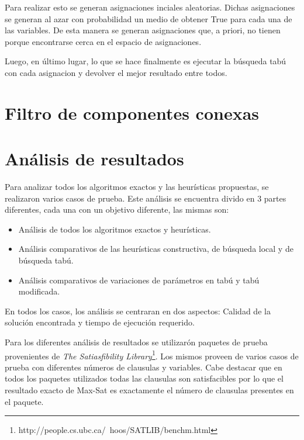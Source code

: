 \documentclass[a4paper,10pt]{article}
\begin{document}
Para realizar esto se generan asignaciones inciales aleatorias. Dichas asignaciones se generan al azar con probabilidad un medio de obtener True para cada una de las variables. De esta manera se generan asignaciones que, a priori, no tienen porque encontrarse cerca en el espacio de asignaciones.

Luego, en \'ultimo lugar, lo que se hace finalmente es ejecutar la b\'usqueda tab\'u con cada asignacion y devolver el mejor resultado entre todos.


\section*{Filtro de componentes conexas}


\section*{An\'alisis de resultados}


Para analizar todos los algoritmos exactos y las heur\'isticas propuestas, se realizaron varios casos de prueba. Este an\'alisis se encuentra divido en 3 partes diferentes, cada una con un objetivo diferente, las mismas son:

\begin{itemize}
\item An\'alisis de todos los algoritmos exactos y heur\'isticas.
\item An\'alisis comparativos de las heur\'isticas constructiva, de b\'usqueda local y de b\'usqueda tab\'u.
\item An\'alisis comparativos de variaciones de par\'ametros en tab\'u y tab\'u modificada.
\end{itemize}
 

En todos los casos, los an\'alisis se centraran en dos aspectos: Calidad de la soluci\'on encontrada y tiempo de ejecuci\'on requerido.

Para los diferentes an\'alisis de resultados se utilizar\'on paquetes de prueba provenientes de \emph{The Satiasfibility Library}\footnote{http://people.cs.ubc.ca/~hoos/SATLIB/benchm.html}. Los mismos proveen de varios casos de prueba con diferentes n\'umeros de clausulas y variables. Cabe destacar que en todos los paquetes utilizados todas las clausulas son satisfacibles por lo que el resultado exacto de Max-Sat es exactamente el n\'umero de clausulas presentes en el paquete.
\end{document}
